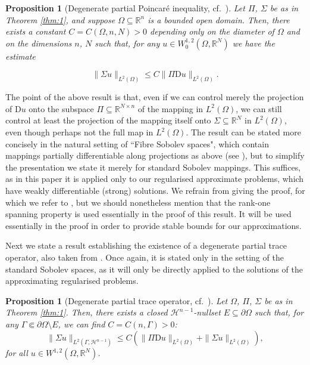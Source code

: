 \documentclass{amsart}
\numberwithin{equation}{section}
\numberwithin{thm}{section}
\newtheorem{prop}[thm]{Proposition}
\theoremstyle{definition}
\def\R{\mathbb{R}}
\def\D{\mathrm{D}}
\renewcommand{\:}{\!:\!} %
\newcommand{\sub}{\subseteq}
\newcommand{\by}{\times}
\renewcommand{\^}[1]{^{#1}_{\phantom{l}}}
\begin{document}
\begin{prop}[Degenerate partial Poincar\'e inequality, cf.\ \cite{nikos1}] \label{prop:1}
Let $\Pi$, $\Sigma$ be as in Theorem \ref{thm:1}, and suppose $\Omega \sub \R^n$ is a bounded open domain. Then, there exists a constant $C = C(\Omega, n, N) > 0$ depending only on the diameter of $\Omega$ and on the dimensions $n$, $N$ such that, for any $u \in W^{1,2}_0(\Omega, \mathbb{R}^N)$ we have the estimate

\begin{equation*}
\| \Sigma u \| _{L^2(\Omega)} \leq C \| \Pi \mathrm{D}u \| _{L^2(\Omega)}.
\end{equation*}
\end{prop}
The point of the above result is that, even if we can control merely the projection of $\D u$ onto the subspace $\Pi \sub\R^{N\by n}$ of the mapping in $L^2(\Omega)$, we can still control at least the projection of the mapping itself onto $\Sigma \sub \R^N$ in $L^2(\Omega)$, even though perhaps not the full map in $L^2(\Omega)$. The result can be stated more concisely in the natural setting of ``Fibre Sobolev spaces", which contain mappings partially differentiable along projections as above (see \cite{K4}), but to simplify the presentation we state it merely for standard Sobolev mappings. This suffices, as in this paper it is applied only to our regularised approximate problems, which have weakly differentiable (strong) solutions. We refrain from giving the proof, for which we refer to \cite{nikos1}, but we should nonetheless mention that the rank-one spanning property is used essentially in the proof of this result. It will be used essentially in the proof in order to provide stable bounds for our approximations.

Next we state a result establishing the existence of a degenerate partial trace operator, also taken from \cite{nikos1}. Once again, it is stated only in the setting of the standard Sobolev spaces, as it will only be directly applied to the solutions of the approximating regularised problems.

\begin{prop}[Degenerate partial trace operator, cf.\ \cite{nikos1}] \label{prop:2}
Let $\Omega$, $\Pi$, $\Sigma$ be as in Theorem \ref{thm:1}. Then, there exists a closed $\mathcal{H}^{n-1}$-nullset $E \subseteq \partial \Omega$ such that, for any $\Gamma \Subset \partial \Omega \setminus E$, we can find $C= C(n,\Gamma) >0$:
\[
\| \Sigma u \| _{L^2(\Gamma, \mathcal{H}^{n-1})} \leq C \left(\| \Pi \mathrm{D}u \| _{L^2(\Omega)} + \| \Sigma u \| _{L^2(\Omega)}\right),
\] 
for all $u \in W^{1,2}(\Omega, \mathbb{R}^N)$.
\end{prop}
\end{document}
